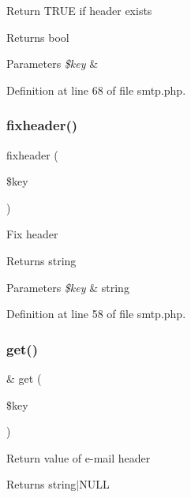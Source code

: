 Return T\+R\+UE if header exists \begin{DoxyReturn}{Returns}
bool 
\end{DoxyReturn}

\begin{DoxyParams}{Parameters}
{\em \$key} & \\
\hline
\end{DoxyParams}


Definition at line 68 of file smtp.\+php.

\hypertarget{class_s_m_t_p_afee77a9b8498c6a0875b75ae7313e545}{}\label{class_s_m_t_p_afee77a9b8498c6a0875b75ae7313e545} 
\subsubsection{\texorpdfstring{fixheader()}{fixheader()}}
{\footnotesize\ttfamily fixheader (\begin{DoxyParamCaption}\item[{}]{\$key }\end{DoxyParamCaption})\hspace{0.3cm}{\ttfamily [protected]}}

Fix header \begin{DoxyReturn}{Returns}
string 
\end{DoxyReturn}

\begin{DoxyParams}{Parameters}
{\em \$key} & string \\
\hline
\end{DoxyParams}


Definition at line 58 of file smtp.\+php.

\hypertarget{class_s_m_t_p_ac3695923790b06917410e205068b8376}{}\label{class_s_m_t_p_ac3695923790b06917410e205068b8376} 
\subsubsection{\texorpdfstring{get()}{get()}}
{\footnotesize\ttfamily \& get (\begin{DoxyParamCaption}\item[{}]{\$key }\end{DoxyParamCaption})}

Return value of e-\/mail header \begin{DoxyReturn}{Returns}
string$\vert$\+N\+U\+LL 
\end{DoxyReturn}

